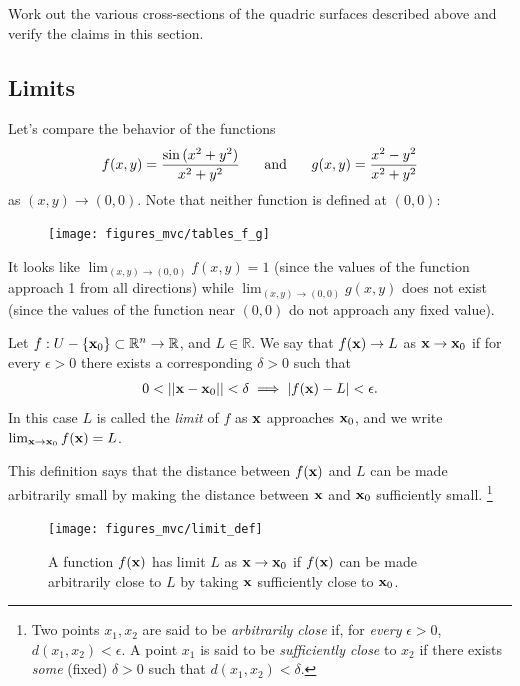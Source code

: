 \documentclass[12pt,letterpaper,reqno]{article}
\numberwithin{equation}{section}
\newcommand{\bx}{{\bf x}}
\begin{document}
{\begin{exercise}
Work out the various cross-sections of the quadric surfaces described above and verify the claims in this section.	
\end{exercise}


\subsection{Limits}
Let's compare the behavior of the functions
\begin{align*}
	f(x,y)=\frac{\sin{(x^2+y^2)}}{x^2+y^2} \hspace{0.5cm} \text{ and } \hspace{0.5cm} g(x,y)=\frac{x^2-y^2}{x^2+y^2}
\end{align*}
as $(x,y) \to (0,0)$. Note that neither function is defined at $(0,0)$:

\begin{figure}[h]
\begin{center}
\texttt{[image: figures\_mvc/tables\_f\_g]}
\end{center}	
\end{figure}
It looks like $\lim_{(x,y) \to (0,0)}f(x,y)=1$ (since the values of the function approach 1 from all directions) while $\lim_{(x,y) \to (0,0)}g(x,y)$ does not exist (since the values of the function near $(0,0)$ do not approach any fixed value).

\begin{defn}[Limit]\label{def:limit}
	Let $f:U-\{\bx_0\} \subset \mathbb{R}^n \to \mathbb{R}$, and $L \in \mathbb{R}$. We say that $f(\bx) \to L$ as $\bx \to \bx_0$ if for every $\epsilon > 0$ there exists a corresponding $\delta>0$ such that
\begin{align*}
	0<||\bx-\bx_0||<\delta \implies |f(\bx)-L|<\epsilon.
\end{align*}
In this case $L$ is called the \emph{limit} of $f$ as $\bx$ approaches $\bx_0$, and  we write $\lim_{\bx \to \bx_0}f(\bx)=L$.
\end{defn}
This definition says that the distance between $f(\bx)$ and $L$ can be made arbitrarily small by making the distance between $\bx$ and  $\bx_0$ sufficiently small. \footnote{Two points $x_1,x_2$ are said to be \emph{arbitrarily close} if, for \emph{every} $\epsilon>0$, $d(x_1,x_2)<\epsilon$. A point $x_1$ is said to be \emph{sufficiently close} to $x_2$ if there exists \emph{some} (fixed) $\delta>0$ such that $d(x_1,x_2)<\delta$.}

\begin{figure}[h]
	\begin{center}
	\texttt{[image: figures\_mvc/limit\_def]}
\end{center}
\caption{A function $f(\bx)$ has limit $L$ as $\bx \to \bx_0$ if $f(\bx)$ can be made arbitrarily close to $L$ by taking $\bx$ sufficiently close to $\bx_0$.}
\end{figure}

}
\end{document}
